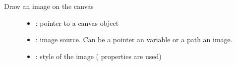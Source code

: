 \documentclass[letterpaper,10pt,english]{sphinxmanual}
\begin{document}
\begin{fulllineitems}
\label{\detokenize{object-types/canvas:_CPPv418lv_canvas_draw_imgP8lv_obj_t10lv_coord_t10lv_coord_tPKvPK10lv_style_t}}%
\pysigstartmultiline
{}\label{\detokenize{object-types/canvas:lv__canvas_8h_1a009c25239c6fa30d630be6d005ee64a7}}%
\pysigstopmultiline
Draw an image on the canvas \begin{description}
\item[{}] \leavevmode\begin{itemize}
\item {} 
: pointer to a canvas object 

\item {} 
: image source. Can be a pointer an  variable or a path an image. 

\item {} 
: style of the image ( properties are used) 

\end{itemize}

\end{description}


\end{fulllineitems}

\end{document}
